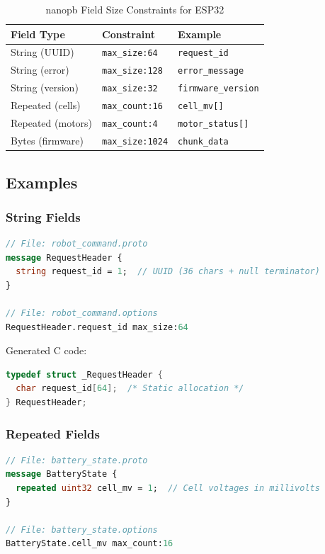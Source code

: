 \begin{table}[H]
\centering
\caption{nanopb Field Size Constraints for ESP32}
\label{tab:nanopb-constraints}
\begin{tabular}{|l|l|l|}
\hline
\textbf{Field Type} & \textbf{Constraint} & \textbf{Example} \\
\hline
String (UUID) & \texttt{max\_size:64} & \texttt{request\_id} \\
\hline
String (error) & \texttt{max\_size:128} & \texttt{error\_message} \\
\hline
String (version) & \texttt{max\_size:32} & \texttt{firmware\_version} \\
\hline
Repeated (cells) & \texttt{max\_count:16} & \texttt{cell\_mv[]} \\
\hline
Repeated (motors) & \texttt{max\_count:4} & \texttt{motor\_status[]} \\
\hline
Bytes (firmware) & \texttt{max\_size:1024} & \texttt{chunk\_data} \\
\hline
\end{tabular}
\end{table}

\subsection{Examples}

\subsubsection{String Fields}

\begin{lstlisting}[language=proto]
// File: robot_command.proto
message RequestHeader {
  string request_id = 1;  // UUID (36 chars + null terminator)
}

// File: robot_command.options
RequestHeader.request_id max_size:64
\end{lstlisting}

Generated C code:
\begin{lstlisting}[language=C]
typedef struct _RequestHeader {
  char request_id[64];  /* Static allocation */
} RequestHeader;


\end{lstlisting}
\subsubsection{Repeated Fields}

\begin{lstlisting}[language=proto]
// File: battery_state.proto
message BatteryState {
  repeated uint32 cell_mv = 1;  // Cell voltages in millivolts
}

// File: battery_state.options
BatteryState.cell_mv max_count:16
\end{lstlisting}

